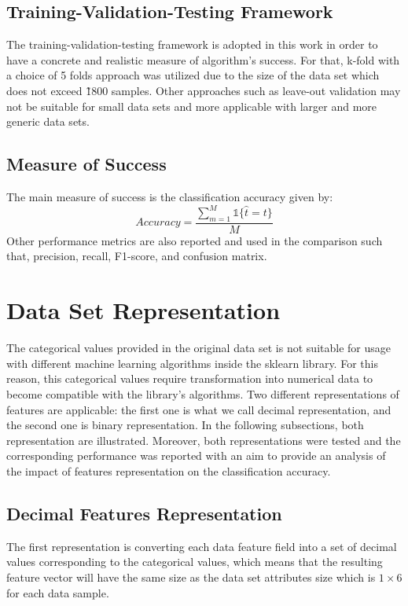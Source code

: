 \documentclass{article}
\begin{document}


\subsection{Training-Validation-Testing Framework}
The training-validation-testing framework is adopted in this work in order to have a concrete and realistic measure of algorithm's success. For that, k-fold with a choice of 5 folds approach was utilized due to the size of the data set which does not exceed \~ 1800 samples. Other approaches such as leave-out validation may not be suitable for small data sets and more applicable with larger and more generic data sets. 

\subsection{Measure of Success}
The main measure of success is the classification accuracy given by: 
\begin{equation}
Accuracy = \frac{\sum_{m=1}^{M} \mathbb{1} \lbrace \hat{t} = t \rbrace }{M}
\end{equation}
Other performance metrics are also reported and used in the comparison such that, precision, recall, F1-score, and confusion matrix. 

\section{Data Set Representation}
The categorical values provided in the original data set is not suitable for usage with different machine learning algorithms inside the sklearn library. For this reason, this categorical values require transformation into numerical data to become compatible with the library's algorithms. Two different representations of features are applicable: the first one is what we call decimal representation, and the second one is binary representation. In the following subsections, both representation are illustrated. Moreover, both representations were tested and the corresponding performance was reported with an aim to provide an analysis of the impact of features representation on the classification accuracy. 

\subsection{Decimal Features Representation}
The first representation is converting each data feature field into a set of decimal values corresponding to the categorical values, which means that the resulting feature vector will have the same size as the data set attributes size which is $1 \times 6$ for each data sample.
\end{document}
